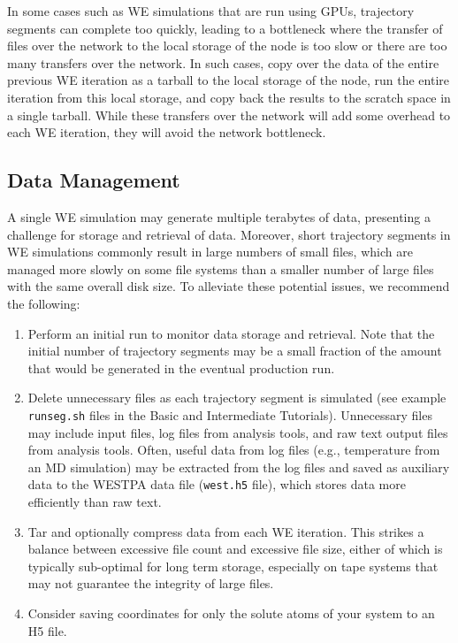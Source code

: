\documentclass[9pt,tutorial]{livecoms}
\begin{document}
In some cases such as WE simulations that are run using GPUs, trajectory segments can complete too quickly, leading to a bottleneck where the transfer of files over the network to the local storage of the node is too slow or there are too many transfers over the network. 
In such cases, copy over the data of the entire previous WE iteration as a tarball  to the local storage of the node, run the entire iteration from this local storage, and copy back the results to the scratch space in a single tarball. 
While these transfers over the network will add some overhead to each WE iteration, they will avoid the network bottleneck. 

\subsection{Data Management}

A single WE simulation may generate multiple terabytes of data, presenting a challenge for storage and retrieval of data. 
Moreover, short trajectory segments in WE simulations commonly result in large numbers of small files, which are managed more slowly on some file systems than a smaller number of large files with the same overall disk size. 
To alleviate these potential issues, we recommend the following:

\begin{enumerate}
\item Perform an initial run to monitor data storage and retrieval. 
Note that the initial number of trajectory segments may be a small fraction of the amount that would be generated in the eventual production run. 
\item Delete unnecessary files as each trajectory segment is simulated (see example \verb|runseg.sh| files in the Basic and Intermediate Tutorials). 
Unnecessary files may include input files, log files from analysis tools, and raw text output files from analysis tools. 
Often, useful data from log files (e.g., temperature from an MD simulation) may be extracted from the log files and saved as auxiliary data to the WESTPA data file (\verb|west.h5| file), which stores data more efficiently than raw text.
\item Tar and optionally compress data from each WE iteration. 
This strikes a balance between excessive file count and excessive file size, either of which is typically sub-optimal for long term storage, especially on tape systems that may not guarantee the integrity of large files.
\item Consider saving coordinates for only the solute atoms of your system to an H5 file.
\end{enumerate}
\end{document}
